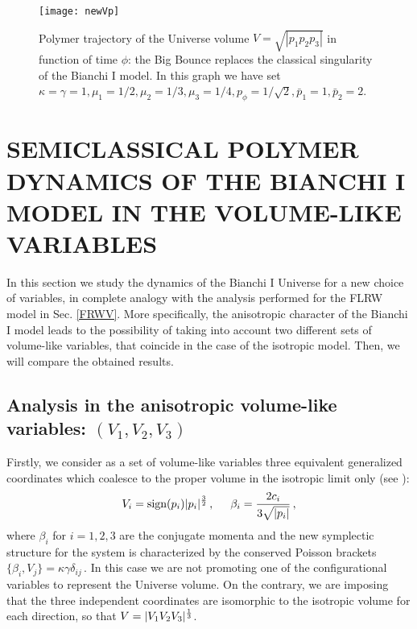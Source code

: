 \documentclass[aps,prd,twocolumn,nofootinbib,superscriptaddress]{revtex4-2}
\newcommand{\sign}{\text{sign}}
\begin{document}
\begin{figure}[h!]
	\centering
	\texttt{[image: newVp]}
	\caption{Polymer trajectory of the Universe volume $V=\sqrt{|p_{1}p_{2}p_{3}|}$ in function of time $\phi$: the Big Bounce replaces the classical singularity of the Bianchi I model. In this graph we have set $\kappa=\gamma=1,\mu_1=1/2,\mu_2=1/3,\mu_3=1/4,p_\phi=1/\sqrt{2},\bar{p}_1=1,\bar{p}_2=2$.}
	\label{V(phi)}
\end{figure}
		
\section{SEMICLASSICAL POLYMER DYNAMICS OF THE BIANCHI I MODEL IN THE VOLUME-LIKE VARIABLES \label{sem2}}

In this section we study the dynamics of the Bianchi I Universe for a new choice of variables, in complete analogy with the analysis performed for the FLRW model in Sec. \ref{FRWV}. More specifically, the anisotropic character of the Bianchi I model leads to the possibility of taking into account two different sets of volume-like variables, that coincide in the case of the isotropic model. Then, we will compare the obtained results.

\subsection{Analysis in the anisotropic volume-like variables: $(V_{1},V_{2},V_{3})$}

Firstly, we consider as a set of volume-like variables three equivalent generalized coordinates which coalesce to the proper volume in the isotropic limit only (see \cite{szulc}):
\begin{equation}
	V_{i}=\sign(p_{i})|p_{i}|^{3\over2}\,,\hspace{0.5cm}\beta_{i}={2c_{i}\over3\sqrt{|p_{i}|}}\,,
\end{equation}
where $\beta_i$ for $i=1,2,3$ are the conjugate momenta and the new symplectic structure for the system is characterized by the conserved Poisson brackets $\{\beta_{i},V_{j}\}=\kappa\gamma\delta_{ij}$\,. In this case we are not promoting one of the configurational variables to represent the Universe volume. On the contrary, we are imposing that the three independent coordinates are isomorphic to the isotropic volume for each direction, so that $V=|V_{1}V_{2}V_{3}|^{1\over3}$.
\end{document}
